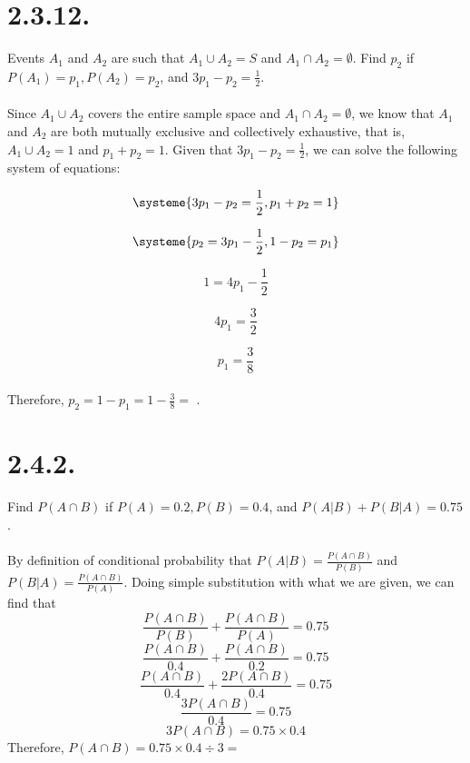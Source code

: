 \documentclass{article}
\begin{document}
{\section*{2.3.12.} 
Events \(A_1\) and \(A_2\) are such that \(A_1 \cup A_2 = S\) and \(A_1 \cap A_2 = \emptyset \). Find \(p_2\) if \( P(A_1) = p_1, P(A_2) = p_2 \), and \( 3p_1 - p_2 = \frac{1}{2} \).\@
\\ \\
Since \(A_1 \cup A_2\) covers the entire sample space and \( A_1 \cap A_2 = \emptyset \), we know that \(A_1\) and \(A_2\) are both mutually exclusive and collectively exhaustive, that is, \(A_1 \cup A_2 = 1\) and \( p_1 + p_2 = 1 \). Given that \( 3p_1 - p_2 = \frac{1}{2} \), we can solve the following system of equations:

\[
\systeme{3p_1 - p_2 = \frac{1}{2}, p_1 + p_2 = 1}
\]

\[
\systeme{p_2 = 3p_1 - \frac{1}{2}, 1 - p_2 = p_1}
\]

\[
1 = 4p_1 - \frac{1}{2}
\]

\[
4p_1 = \frac{3}{2}
\]

\[
p_1 = \frac{3}{8}
\]
\\
Therefore, \( p_2 = 1 - p_1 = 1 - \frac{3}{8} = \) .

\section*{2.4.2.} 
Find \(P(A \cap B)\) if \(P(A) = 0.2, P(B) = 0.4\), and \(P(A|B) + P(B|A) = 0.75\).\@
\\ \\ 
By definition of conditional probability that \(P(A|B) = \frac{P(A \cap B)}{P(B)} \) and \( P(B|A) = \frac{P(A \cap B)}{P(A)} \). Doing simple substitution with what we are given, we can find that \\
\[ 
\frac{P(A \cap B)}{P(B)} + \frac{P(A \cap B)}{P(A)} = 0.75 
\]
\[ 
\frac{P(A \cap B)}{0.4} + \frac{P(A \cap B)}{0.2} = 0.75 
\]
\[ 
\frac{P(A \cap B)}{0.4} + \frac{2P(A \cap B)}{0.4} = 0.75 
\]
\[ 
\frac{3P(A \cap B)}{0.4} = 0.75 
\]
\[ 
3P(A \cap B) = 0.75 \times 0.4
\]
Therefore, \( P(A \cap B) = 0.75 \times 0.4 \div 3 = \) 

}
\end{document}
